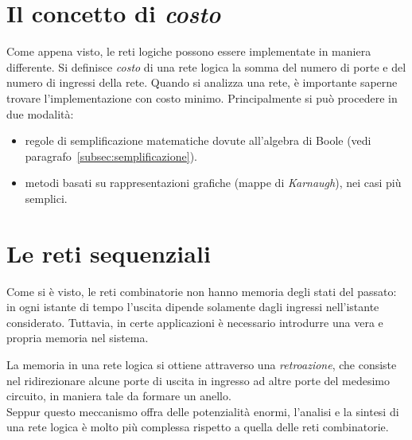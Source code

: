 \documentclass[class=book, crop=false]{standalone}
\begin{document}
\section{Il concetto di \emph{costo}}
Come appena visto, le reti logiche possono essere implementate in maniera differente. Si definisce \emph{costo} di una rete logica la somma del numero di porte e del numero di ingressi della rete. Quando si analizza una rete, è importante saperne trovare l'implementazione con costo minimo. Principalmente si può procedere in due modalità:
\begin{itemize}[noitemsep]
	\item regole di semplificazione matematiche dovute all'algebra di Boole (vedi paragrafo~\ref{subsec:semplificazione}).
	\item metodi basati su rappresentazioni grafiche (mappe di \emph{Karnaugh}), nei casi più semplici.
\end{itemize}

\section{Le reti sequenziali}
Come si è visto, le reti combinatorie non hanno memoria degli stati del passato: in ogni istante di tempo l’uscita dipende solamente dagli ingressi nell’istante considerato. Tuttavia, in certe applicazioni è necessario introdurre una vera e propria memoria nel sistema.

La memoria in una rete logica si ottiene attraverso una \emph{retroazione}, che consiste nel ridirezionare alcune porte di uscita in ingresso ad altre porte del medesimo circuito, in maniera tale da formare un anello.\\
Seppur questo meccanismo offra delle potenzialità enormi, l'analisi e la sintesi di una rete logica è molto più complessa rispetto a quella delle reti combinatorie.
\end{document}
